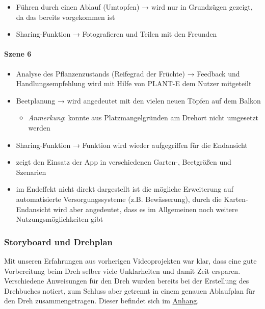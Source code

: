 \begin{itemize}
\tightlist
\item
  Führen durch einen Ablauf (Umtopfen) → wird nur in Grundzügen gezeigt,
  da das bereits vorgekommen ist
\item
  Sharing-Funktion → Fotografieren und Teilen mit den Freunden
\end{itemize}

\hypertarget{szene-6}{%
\paragraph{Szene 6}\label{szene-6}}

\begin{itemize}
\tightlist
\item
  Analyse des Pflanzenzustands (Reifegrad der Früchte) → Feedback und
  Handlungsempfehlung wird mit Hilfe von PLANT-E dem Nutzer mitgeteilt
\item
  Beetplanung → wird angedeutet mit den vielen neuen Töpfen auf dem
  Balkon

  \begin{itemize}
  \tightlist
  \item
    \emph{Anmerkung}: konnte aus Platzmangelgründen am Drehort nicht
    umgesetzt werden
  \end{itemize}
\item
  Sharing-Funktion → Funktion wird wieder aufgegriffen für die
  Endansicht
\item
  zeigt den Einsatz der App in verschiedenen Garten-, Beetgrößen und
  Szenarien
\item
  im Endeffekt nicht direkt dargestellt ist die mögliche Erweiterung auf
  automatisierte Versorgungssysteme (z.B. Bewässerung), durch die
  Karten-Endansicht wird aber angedeutet, dass es im Allgemeinen noch
  weitere Nutzungsmöglichkeiten gibt
\end{itemize}

\hypertarget{storyboard-und-drehplan}{%
\subsubsection{Storyboard und Drehplan}\label{storyboard-und-drehplan}}

Mit unseren Erfahrungen aus vorherigen Videoprojekten war klar, dass
eine gute Vorbereitung beim Dreh selber viele Unklarheiten und damit
Zeit ersparen. Verschiedene Anweisungen für den Dreh wurden bereits bei
der Erstellung des Drehbuches notiert, zum Schluss aber getrennt in
einem genauen Ablaufplan für den Dreh zusammengetragen. Dieser befindet
sich im \protect\hyperlink{anhang}{Anhang}.

